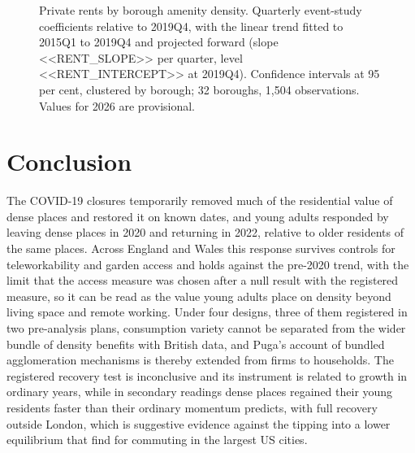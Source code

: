 \documentclass[11pt,a4paper]{article}
\begin{document}
\begin{figure}[htbp]
\centering
{}
\caption{Private rents by borough amenity density. Quarterly event-study coefficients relative to 2019Q4, with the linear trend fitted to 2015Q1 to 2019Q4 and projected forward (slope <<RENT_SLOPE>> per quarter, level <<RENT_INTERCEPT>> at 2019Q4). Confidence intervals at 95 per cent, clustered by borough; 32 boroughs, 1,504 observations. Values for 2026 are provisional.}\label{fig:rent}
\end{figure}

\section{Conclusion}\label{sec:conclusion}

The COVID-19 closures temporarily removed much of the residential value of dense places and restored it on known dates, and young adults responded by leaving dense places in 2020 and returning in 2022, relative to older residents of the same places. Across England and Wales this response survives controls for teleworkability and garden access and holds against the pre-2020 trend, with the limit that the access measure was chosen after a null result with the registered measure, so it can be read as the value young adults place on density beyond living space and remote working. Under four designs, three of them registered in two pre-analysis plans, consumption variety cannot be separated from the wider bundle of density benefits with British data, and Puga's account of bundled agglomeration mechanisms is thereby extended from firms to households. The registered recovery test is inconclusive and its instrument is related to growth in ordinary years, while in secondary readings dense places regained their young residents faster than their ordinary momentum predicts, with full recovery outside London, which is suggestive evidence against the tipping into a lower equilibrium that \citet{monte2026} find for commuting in the largest US cities.
\end{document}
